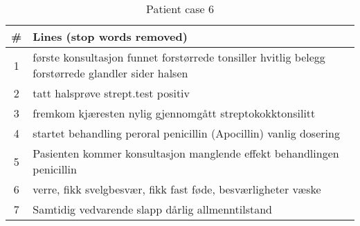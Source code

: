 \begin{table}[htbp] \footnotesize \center
\caption{Patient case 6\label{tab:pcase6}}
\begin{tabularx}{\textwidth}{c X}
    \toprule
    \# & Lines (stop words removed) \\
    \midrule
	1 & første konsultasjon funnet forstørrede tonsiller hvitlig belegg forstørrede glandler sider halsen \\
	2 & tatt halsprøve strept.test positiv \\
	3 & fremkom kjæresten nylig gjennomgått streptokokktonsilitt \\
	4 & startet behandling peroral penicillin (Apocillin) vanlig dosering \\
	5 & Pasienten kommer konsultasjon manglende effekt behandlingen penicillin \\
	6 & verre, fikk svelgbesvær, fikk fast føde, besværligheter væske \\
	7 & Samtidig vedvarende slapp dårlig allmenntilstand \\
	\bottomrule
\end{tabularx}
\end{table}


